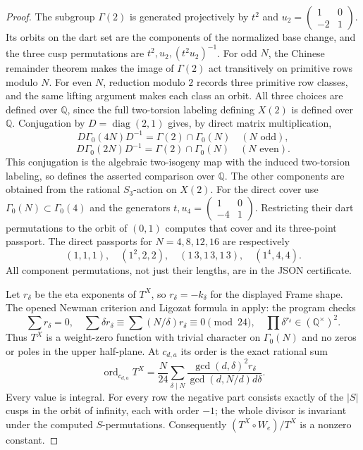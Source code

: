 \begin{proof}
The subgroup $\Gamma(2)$ is generated projectively by $t^2$ and $u_2=\left(\begin{smallmatrix}1&0\\-2&1\end{smallmatrix}\right)$. Its orbits on the dart set are the components of the normalized base change, and the three cusp permutations are $t^2,u_2,(t^2u_2)^{-1}$. For odd $N$, the Chinese remainder theorem makes the image of $\Gamma(2)$ act transitively on primitive rows modulo $N$. For even $N$, reduction modulo $2$ records three primitive row classes, and the same lifting argument makes each class an orbit. All three choices are defined over $\mathbb Q$, since the full two-torsion labeling defining $X(2)$ is defined over $\mathbb Q$. Conjugation by $D=\operatorname{diag}(2,1)$ gives, by direct matrix multiplication,
\[
 D\Gamma_0(4N)D^{-1}=\Gamma(2)\cap\Gamma_0(N)\quad(N\text{ odd}),
\]
\[
 D\Gamma_0(2N)D^{-1}=\Gamma(2)\cap\Gamma_0(N)\quad(N\text{ even}).
\]
This conjugation is the algebraic two-isogeny map with the induced two-torsion labeling, so defines the asserted comparison over $\mathbb Q$. The other components are obtained from the rational $S_3$-action on $X(2)$. For the direct cover use $\Gamma_0(N)\subset\Gamma_0(4)$ and the generators $t,u_4=\left(\begin{smallmatrix}1&0\\-4&1\end{smallmatrix}\right)$. Restricting their dart permutations to the orbit of $(0,1)$ computes that cover and its three-point passport. The direct passports for $N=4,8,12,16$ are respectively
\[
 (1,1,1),\quad(1^2,2,2),\quad(1\,3,1\,3,1\,3),\quad(1^4,4,4).
\]
All component permutations, not just their lengths, are in the JSON certificate.

Let $r_\delta$ be the eta exponents of $T^X$, so $r_\delta=-k_\delta$ for the displayed Frame shape. The opened Newman criterion and Ligozat formula in \cite[p.~2]{RouseWebb2015} apply: the program checks
\[
 \sum r_\delta=0,\quad\sum\delta r_\delta\equiv
 \sum(N/\delta)r_\delta\equiv0\pmod{24},\quad
 \prod\delta^{r_\delta}\in(\mathbb Q^\times)^2.
\]
Thus $T^X$ is a weight-zero function with trivial character on $\Gamma_0(N)$ and no zeros or poles in the upper half-plane. At $c_{d,a}$ its order is the exact rational sum
\[
 \operatorname{ord}_{c_{d,a}}T^X=
 \frac N{24}\sum_{\delta\mid N}
 \frac{\gcd(d,\delta)^2r_\delta}{\gcd(d,N/d)d\delta}.
\]
Every value is integral. For every row the negative part consists exactly of the $|S|$ cusps in the orbit of infinity, each with order $-1$; the whole divisor is invariant under the computed $S$-permutations. Consequently $(T^X\circ W_e)/T^X$ is a nonzero constant.


\end{proof}
